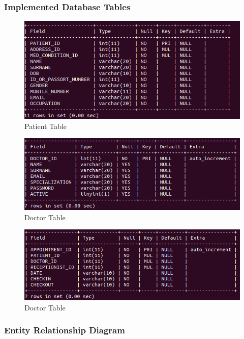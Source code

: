 \documentclass[11 pt]{article}
\begin{document}
    \subsubsection{Implemented Database Tables}
    \begin{figure}[h]
    \centering
    
    \includegraphics[width=0.8\linewidth]{PATIENT_TABLE.png}
    \caption{Patient Table}
    \end{figure}
    \begin{figure}[h]
    \centering
    
    \includegraphics[width=0.7\linewidth]{DOCTOR_TABLE.png}
    \caption{Doctor Table}
    \end{figure}
    
    \begin{figure}[h]
    \centering
    
    \includegraphics[width=\linewidth]{APPOINTMENT_TABLE.png}
    \caption{Doctor Table}
    \end{figure}
    
    \subsubsection{Entity Relationship Diagram}
\end{document}

